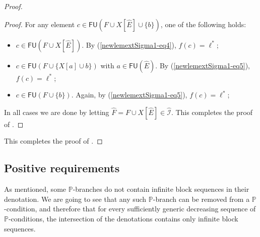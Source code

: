 \documentclass{article}
\def\PP{\mathbb{P}}
\def\I{\mathcal{I}}
\newcommand{\FU}[0]{\mathsf{FU}} %
\def\h#1{\hat{#1}}
\numberwithin{theorem}{section}
\begin{document}
\begin{proof}
\begin{proof}
For any element $c \in \FU(F \cup X[\h E] \cup \{b\})$, one of the following holds:
\begin{itemize}
    \item[(i)] $c \in \FU(F \cup X[\h E])$. By (\ref{newlemextSigma1-eq4}), $f(c) = \ell^*$;
    \item[(ii)] $c \in \FU(F \cup \{X[a] \cup b\})$ with $a \in \FU(\h E)$. By (\ref{newlemextSigma1-eq5}), $f(c) = \ell^*$;
    \item[(iii)] $c \in \FU(F \cup \{b\})$. Again, by (\ref{newlemextSigma1-eq5}), $f(c) = \ell^*$;
\end{itemize}
In all cases we are done by letting $\hat F = F \cup X[\h E] \in \h \I$.
This completes the proof of .
\end{proof}
This completes the proof of .
\end{proof}

\subsection{Positive requirements}

As mentioned, some $\PP$-branches do not contain infinite block sequences in their denotation.
We are going to see that any such $\PP$-branch can be removed from a $\PP$-condition, and therefore that for every sufficiently generic decreasing sequence of $\PP$-conditions, the intersection of the denotations contains only infinite block sequences.
\end{document}
